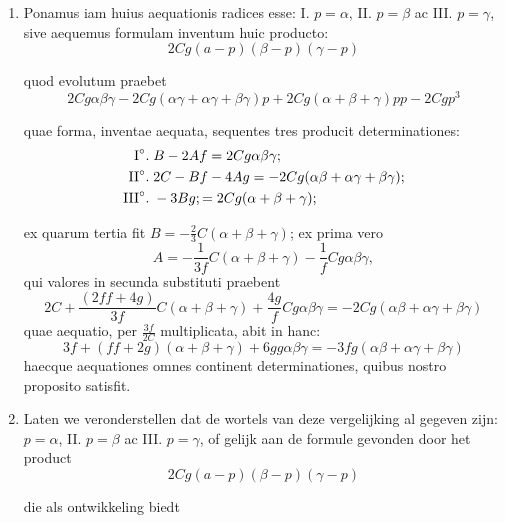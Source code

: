 \documentclass[10pt,a4paper]{article}
\newcommand{\switchenum}{\setcounter{enumi}{\arabic{enumi}-1}\switchcolumn}
\begin{document}
\begin{paracol}{2}
\begin{enumerate}[topsep=1px]
		\switchcolumn*
		
		\item Ponamus iam huius aequationis radices esse: I\degree. $p=\alpha$, II\degree. $p=\beta$ ac III\degree. $p=\gamma$, sive aequemus formulam inventum huic producto:
		\[
			2Cg(a-p)(\beta-p)(\gamma-p)
		\]
		\par quod evolutum praebet
		\[
			2Cg\alpha \beta \gamma - 2Cg(\alpha \gamma+\alpha \gamma+\beta \gamma)p+2Cg(\alpha+\beta+\gamma)pp - 2Cgp^3
		\]
		\par quae forma, inventae aequata, sequentes tres producit determinationes:
		\begin{align*}
			\text{I}\degree. \;& B-2Af = 2Cg\alpha\beta\gamma;\\
			\text{II}\degree. \; & 2C-Bf-4Ag = -2Cg(\alpha \beta +\alpha \gamma+\beta \gamma);\\
			\text{III}\degree. \; & -3Bg; = 2Cg(\alpha+\beta+\gamma);
		\end{align*}
		
		\par ex quarum tertia fit $B=-\frac{2}{3}C(\alpha+\beta+\gamma)$; ex prima vero
		\[
			A = -\frac{1}{3f}C(\alpha+\beta+\gamma)-\frac{1}{f}Cg\alpha \beta \gamma,
		\]
		qui valores in secunda substituti praebent
		\[
			2C+\frac{(2ff+4g)}{3f}C(\alpha+ \beta + \gamma)+\frac{4g}{f}Cg\alpha \beta \gamma  = -2Cg(\alpha \beta + \alpha \gamma+\beta \gamma)
		\]
		quae aequatio, per $\frac{3f}{2C}$ multiplicata, abit in hanc:
		\[
			3f+(ff+2g)(\alpha+\beta+\gamma)+6gg\alpha  \beta \gamma = -3fg(\alpha \beta + \alpha \gamma + \beta \gamma)
		\]
		haecque aequationes omnes continent determinationes, quibus nostro proposito satisfit.
		
		\switchenum
		\item Laten we veronderstellen dat de wortels van deze vergelijking al gegeven zijn: $p=\alpha$, II\degree. $p=\beta$ ac III\degree. $p=\gamma$, of gelijk aan de formule gevonden door het product
		\[
			2Cg(a-p)(\beta-p)(\gamma-p)
		\]
		\par die als ontwikkeling biedt
		

\end{enumerate}
\end{paracol}
\end{document}
